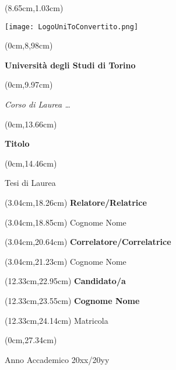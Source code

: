 \documentclass[a4paper,10 pt,titlepage,twoside]{book}
\begin{document}
\frontmatter

\thispagestyle{empty}

\begingroup
\TahomaFont


\begin{textblock*}{4cm}(8.65cm,1.03cm)
	\centerline {\texttt{[image: LogoUniToConvertito.png]}}
\end{textblock*}


\begin{textblock*}{21cm}(0cm,8,98cm)
	\fontsize{18}{22}\selectfont
	\centerline {\textbf{ Universit\`a degli Studi di Torino}}
\end{textblock*}
\begin{textblock*}{21cm}(0cm,9.97cm)
	\fontsize{18}{22}\selectfont
	\centerline {\textit{Corso di Laurea \dots}}
\end{textblock*}


\begin{textblock*}{21cm}(0cm,13.66cm)
	\fontsize{20}{24}\selectfont
	\centerline  {\textbf{Titolo}}
\end{textblock*}
\begin{textblock*}{21cm}(0cm,14.46cm)
	\fontsize{18}{22}\selectfont
	\centerline{\Large {Tesi di Laurea}}
\end{textblock*}



\fontsize{14}{17}\selectfont

\begin{textblock*}{8cm}(3.04cm,18.26cm)
	\noindent 
	\textbf{Relatore/Relatrice}
\end{textblock*}
\begin{textblock*}{8cm}(3.04cm,18.85cm)
	\noindent 
	Cognome Nome
\end{textblock*}

\begin{textblock*}{8cm}(3.04cm,20.64cm)
	\noindent 
	\textbf{Correlatore/Correlatrice}
\end{textblock*}
\begin{textblock*}{8cm}(3.04cm,21.23cm)
	\noindent
	Cognome Nome
\end{textblock*}

\begin{textblock*}{8cm}(12.33cm,22.95cm)
	\noindent
	\textbf{Candidato/a}
\end{textblock*}
\begin{textblock*}{8cm}(12.33cm,23.55cm)
	\noindent	\textbf{Cognome Nome}
\end{textblock*}
\begin{textblock*}{8cm}(12.33cm,24.14cm)
	\noindent	Matricola
\end{textblock*}

\begin{textblock*}{21cm}(0cm,27.34cm)
	\centerline{Anno Accademico 20xx/20yy}
\end{textblock*}

\endgroup

\newpage
$ $

\newpage
$ $

\end{document}
